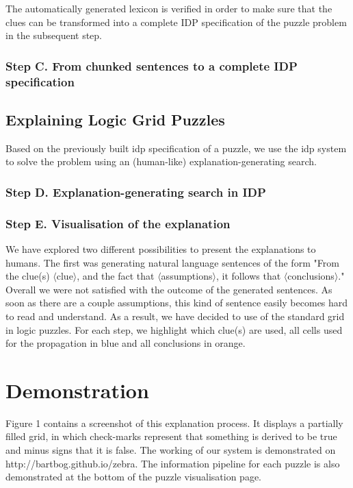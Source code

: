 The automatically generated lexicon is verified in order to make sure that the clues can be transformed into a complete IDP specification of the puzzle problem in the subsequent step.

\subsubsection*{Step C. From chunked sentences to a complete IDP specification} \label{chunked_to_logic}


\subsection{Explaining Logic Grid Puzzles} \label{explaining_puzzles}
Based on the previously built idp specification of a puzzle, we use the idp system to solve the problem using an (human-like) explanation-generating search.

\subsubsection*{Step D. Explanation-generating search in IDP} \label{idp_search}


\subsubsection*{Step E. Visualisation of the explanation} \label{visualisation_explanation}
We have explored two different possibilities to present the explanations to humans. The first was generating natural language sentences of the form "From the clue(s) $\langle$clue$\rangle$, and the fact that $\langle$assumptions$\rangle$, it follows that $\langle$conclusions$\rangle$." Overall we were not satisfied with the outcome of the generated sentences. As soon as there are a couple assumptions, this kind of sentence easily becomes hard to read and understand. As a result, we have decided to use of the standard grid in logic puzzles. For each step, we highlight which clue(s) are used, all cells used for the propagation in blue and all conclusions in orange.

\section{Demonstration}
Figure 1 contains a screenshot of this explanation process. It displays a partially filled grid, in which check-marks represent that something is derived to be true and minus signs that it is false. The working of our system is demonstrated on http://bartbog.github.io/zebra. The information pipeline for each puzzle is also demonstrated at the bottom of the puzzle visualisation page.